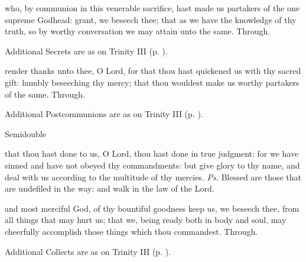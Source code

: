 
\secret
{} who, by communion in this venerable sacrifice, hast made us partakers of the one supreme Godhead: grant, we beseech thee; that as we have the knowledge of thy truth, so by worthy conversation we may attain unto the same. Through.
\begin{rubric}
    Additional Secrets are as on Trinity III (p. \pageref{TrinityIII}).
\end{rubric}


\postcommunion
{} render thanks unto thee, O Lord, for that thou hast quickened us with thy sacred gift: humbly beseeching thy mercy; that thou wouldest make us worthy partakers of the same. Through.
\begin{rubric}
    Additional Postcommunions are as on Trinity III (p. \pageref{TrinityIII}).
\end{rubric}

\begin{inhead}
{Semidouble}
\end{inhead}
\par\noindent
{}


\introit
{} that thou hast done to us, O Lord, thou hast done in true judgment: for we have sinned and have not obeyed thy commandments: but give glory to thy name, and deal with us according to the multitude of thy mercies. \textit{Ps.} Blessed are those that are undefiled in the way: and walk in the law of the Lord.

\collect
{} and most merciful God, of thy bountiful goodness keep us, we beseech thee, from all things that may hurt us; that we, being ready both in body and soul, may cheerfully accomplish those things which thou commandest. Through.
\begin{rubric}
    Additional Collects are as on Trinity III (p. \pageref{TrinityIII}).
\end{rubric}

